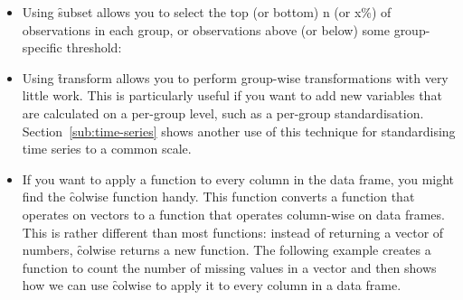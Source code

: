 \begin{itemize}
  \item Using \f{subset} allows you to select the top (or bottom) n (or x\%) of observations in each group, or observations above (or below) some group-specific threshold:
  
    
  
  \item Using \f{transform} allows you to perform group-wise transformations with very little work.  This is particularly useful if you want to add new variables that are calculated on a per-group level, such as a per-group standardisation.  Section~\ref{sub:time-series} shows another use of this technique for standardising time series to a common scale.
  
    

  \item If you want to apply a function to every column in the data frame, you might find the \f{colwise} function handy. This function converts a function that operates on vectors to a function that operates column-wise on data frames. This is rather different than most functions: instead of returning a vector of numbers, \f{colwise} returns a new function. The following example creates a function to count the number of missing values in a vector and then shows how we can use \f{colwise} to apply it to every column in a data frame.

    
  

\end{itemize}
